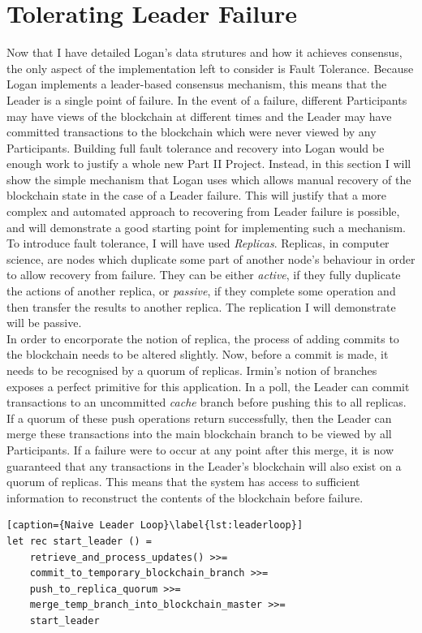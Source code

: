\documentclass[12pt,a4paper,twoside,openright]{report}
\begin{document}
	\section{Tolerating Leader Failure}\label{sec:faulttol}
	Now that I have detailed Logan's data strutures and how it achieves consensus, the only aspect of the implementation left to consider is Fault Tolerance.
	Because Logan implements a leader-based consensus mechanism, this means that the Leader is a single point of failure.
	In the event of a failure, different Participants may have views of the blockchain at different times and the Leader may have committed transactions to the blockchain which were never viewed by any Participants. 
	Building full fault tolerance and recovery into Logan would be enough work to justify a whole new Part II Project. 
	Instead, in this section I will show the simple mechanism that Logan uses which allows manual recovery of the blockchain state in the case of a Leader failure. 
	This will justify that a more complex and automated approach to recovering from Leader failure is possible, and will demonstrate a good starting point for implementing such a mechanism. \\

	To introduce fault tolerance, I will have used \textit{Replicas}. 
	Replicas, in computer science, are nodes which duplicate some part of another node's behaviour in order to allow recovery from failure. 
	They can be either \textit{active}, if they fully duplicate the actions of another replica, or \textit{passive}, if they complete some operation and then transfer the results to another replica.
	The replication I will demonstrate will be passive.\\

	In order to encorporate the notion of replica, the process of adding commits to the blockchain needs to be altered slightly.
	Now, before a commit is made, it needs to be recognised by a quorum of replicas.
	Irmin's notion of branches exposes a perfect primitive for this application.
	In a poll, the Leader can commit transactions to an uncommitted \textit{cache} branch before pushing this to all replicas.
	If a quorum of these push operations return successfully, then the Leader can merge these transactions into the main blockchain branch to be viewed by all Participants.
	If a failure were to occur at any point after this merge, it is now guaranteed that any transactions in the Leader's blockchain will also exist on a quorum of replicas.
	This means that the system has access to sufficient information to reconstruct the contents of the blockchain before failure.\\
	\begin{minipage}{\linewidth}
	\begin{lstlisting}[caption={Naive Leader Loop}\label{lst:leaderloop}]
let rec start_leader () = 
	retrieve_and_process_updates() >>= 
	commit_to_temporary_blockchain_branch >>=
	push_to_replica_quorum >>=
	merge_temp_branch_into_blockchain_master >>=
	start_leader
	\end{lstlisting}
	\end{minipage}
	\\
\end{document}
